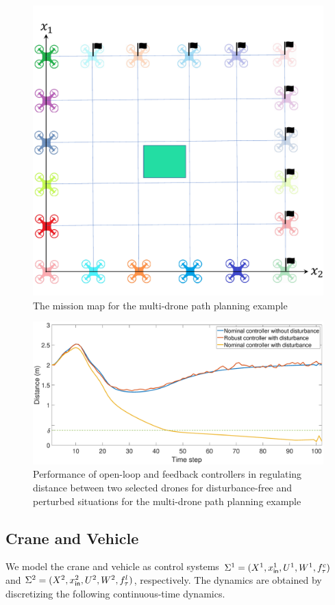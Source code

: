 \begin{figure}[t]
	\centering
	\includegraphics[width=.2\textwidth]{figures/multidrone.pdf}
	\caption{The mission map for the multi-drone path planning example}
	\label{fig:MA}
\end{figure}
\begin{figure}[t]
	\centering
	\includegraphics[width=.4\textwidth]{figures/multi_drone2.eps}
	\caption{Performance of open-loop and feedback controllers in regulating distance between two selected drones for disturbance-free and perturbed situations for the multi-drone path planning example}
	\label{fig:multi_drone_distance}
\end{figure}

\subsection{Crane and Vehicle}
\label{subsec:crane_vehicle}
We model the crane and vehicle as control systems 
$\Sigma^1=(X^1,x_{\mathsf{in}}^1,U^1,W^1,f_\tau^c)$ and $\Sigma^2=(X^2,x_{\mathsf{in}}^2,U^2,W^2,f_\tau^l)$, respectively.
The dynamics are obtained by discretizing the following continuous-time dynamics.

